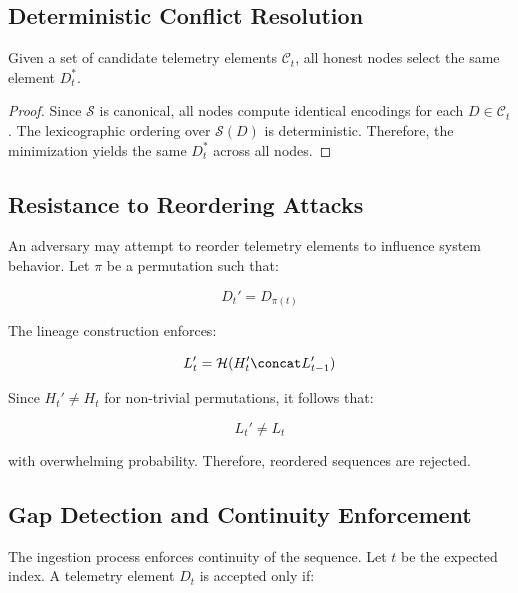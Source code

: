 \subsection{Deterministic Conflict Resolution}

\begin{theorem}
Given a set of candidate telemetry elements $\mathcal{C}_t$, all honest nodes select the same element $D_t^*$.
\end{theorem}

\begin{proof}
Since $\mathcal{S}$ is canonical, all nodes compute identical encodings for each $D \in \mathcal{C}_t$. The lexicographic ordering over $\mathcal{S}(D)$ is deterministic. Therefore, the minimization yields the same $D_t^*$ across all nodes.
\end{proof}

\subsection{Resistance to Reordering Attacks}

An adversary may attempt to reorder telemetry elements to influence system behavior. Let $\pi$ be a permutation such that:

\begin{equation}
D_t' = D_{\pi(t)}
\end{equation}

The lineage construction enforces:

\begin{equation}
L_t' = \mathcal{H}(H_t' \concat L_{t-1}')
\end{equation}

Since $H_t' \neq H_t$ for non-trivial permutations, it follows that:

\begin{equation}
L_t' \neq L_t
\end{equation}

with overwhelming probability. Therefore, reordered sequences are rejected.

\subsection{Gap Detection and Continuity Enforcement}

The ingestion process enforces continuity of the sequence. Let $t$ be the expected index. A telemetry element $D_t$ is accepted only if:

